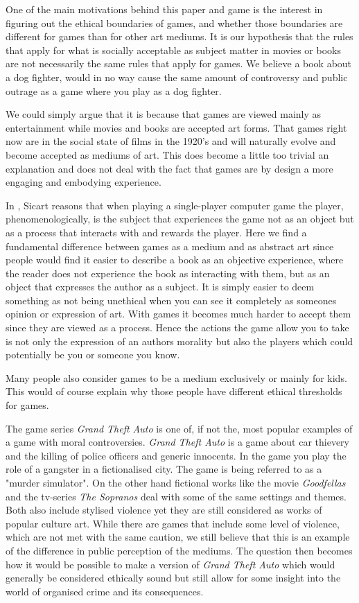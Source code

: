 One of the main motivations behind this paper and game is the interest in figuring out the ethical boundaries of games, and whether those boundaries are different for games than for other art mediums. It is our hypothesis that the rules that apply for what is socially acceptable as subject matter in movies or books are not necessarily the same rules that apply for games. We believe a book about a dog fighter, would in no way cause the same amount of controversy and public outrage as a game where you play as a dog fighter. \

We could simply argue that it is because that games are viewed mainly as entertainment while movies and books are accepted art forms. That games right now are in the social state of films in the 1920's and will naturally evolve and become accepted as mediums of art. This does become a little too trivial an explanation and does not deal with the fact that games are by design a more engaging and embodying experience.\

In \citep{sicart2011ethics}, Sicart reasons that when playing a single-player computer game the player, phenomenologically, is the subject that experiences the game not as an object but as a process that interacts with and rewards the player. Here we find a fundamental difference between games as a medium and as abstract art since people would find it easier to describe a book as an objective experience, where the reader does not experience the book as interacting with them, but as an object that expresses the author as a subject. It is simply easier to deem something as not being unethical when you can see it completely as someones opinion or expression of art. With games it becomes much harder to accept them since they are viewed as a process. Hence the actions the game allow you to take is not only the expression of an authors morality but also the players which could potentially be you or someone you know. \

Many people also consider games to be a medium exclusively or mainly for kids. This would of course explain why those people have different ethical thresholds for games. \

The game series \textit{Grand Theft Auto} \citep{north2013grand} is one of, if not the, most popular examples of a game with moral controversies. \textit{Grand Theft Auto} is a game about car thievery and the killing of police officers and generic innocents. In the game you play the role of a gangster in a fictionalised city. The game is being referred to as a "murder simulator".\citep{murdersim} On the other hand fictional works like the movie \textit{Goodfellas} and the tv-series \textit{The Sopranos} deal with some of the same settings and themes. Both also include stylised violence yet they are still considered as works of popular culture art.\citep{sicart2011ethics} While there are games that include some level of violence, which are not met with the same caution, we still believe that this is an example of the difference in public perception of the mediums. The question then becomes how it would be possible to make a version of \textit{Grand Theft Auto} which would generally be considered ethically sound but still allow for some insight into the world of organised crime and its consequences.\

